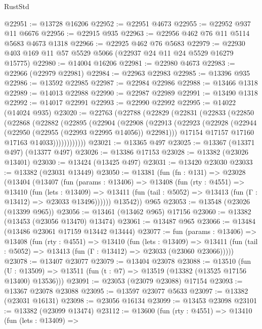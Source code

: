 \begin{lexlean}{RustStd}
\begin{coremodule}
@22951 := @13728 @16206
@22952 := @22951 @4673
@22955 := @22952 @937 @11 @6676
@22956 := @22915 @935
@22963 := @22956 @462 @76 @11 @5114 @5683 @4673 @1318
@22966 := @22925 @462 @76 @5683
@22979 := @22930 @403 @169 @11 @57 @5529 @5066 (@22937 @24 @11 @24 @5529 @16279 @15775)
@22980 := @14004 @16206
@22981 := @22980 @4673
@22983 := @22966 (@22979 @22981)
@22984 := @22963 @22983
@22985 := @13396 @935
@22986 := @13592 @22985
@22987 := @22984 @22986
@22988 := @13466 @1318
@22989 := @14013 @22988
@22990 := @22987 @22989
@22991 := @13490 @1318
@22992 := @14017 @22991
@22993 := @22990 @22992
@22995 := @14022 (@14024 @935)
@23020 := @22763
    (@22788
      (@22829
        (@22831
          (@22833
            (@22850
              (@22868
                (@22882
                  (@22895
                    (@22904
                      (@22908
                        (@22913
                          (@22923
                            (@22928 (@22944 (@22950 (@22955 (@22993 @22995 @14056)) @22981)))
                            @17154
                            @17157
                            @17160
                            @17163
                            @14033))))))))))))
@23021 := @13365 @497
@23025 := @13367 (@13371 @497) (@13377 @497)
@23026 := @13386 @17153
@23028 := @13382 (@23026 @13401)
@23030 := @13424 (@13425 @497)
@23031 := @13420 @23030
@23033 := @13382 (@23031 @13449)
@23050 := @13381
    (fun (fn : @131) =>
    @23028
      (@13404
        (@13407
          (fun (params : @13406) =>
          @13408
            (fun (rty : @4551) =>
            @13410
              (fun (lets : @13409) =>
              @13411 (fun (tail : @5052) => @13413 (fun (Γ : @13412) => @23033 @13496))))))
        @13542))
    @965
@23053 := @13548 (@23026 (@13399 @965))
@23056 := @13461 (@13462 @965) @17156
@23060 := @13382 (@13453 (@23056 @13470) @13474)
@23061 := @13487 @965
@23066 := @13484 (@13486 @23061 @17159 @13442 @13444)
@23077 := fun (params : @13406) =>
  @13408
    (fun (rty : @4551) =>
    @13410
      (fun (lets : @13409) =>
      @13411 (fun (tail : @5052) => @13413 (fun (Γ : @13412) => @23033 (@23060 @23066)))))
@23078 := @13407 @23077
@23079 := @13404 @23078
@23088 := @13510
    (fun (U : @13509) => @13511 (fun (t : @7) => @13519 (@13382 (@13525 @17156 @13400) @13536)))
@23091 := @23053 (@23079 @23088) @17154
@23093 := @13367 @23078 @23088
@23095 := @13597 @23077 @5633
@23097 := @13382 (@23031 @16131)
@23098 := @23056 @16134
@23099 := @13453 @23098
@23101 := @13382 (@23099 @13474)
@23112 := @13600
    (fun (rty : @4551) =>
    @13410
      (fun (lets : @13409) =>

\end{coremodule}
\end{lexlean}
